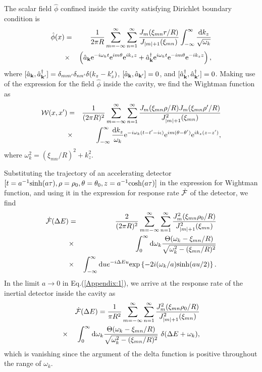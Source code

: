\documentclass[aps,prl,nofootinbib,preprintnumbers,floatfix,twocolumn,superscriptaddress]{revtex4}
\def\nn{\nonumber}
\def\nn{\nonumber}
\def\l{\left}
\def\r{\right}
\def\d{{\rm d}}
\def\f{\frac}
\def\e{{\rm e}}
\begin{document}
The scalar field ${\hat \phi}$ confined inside the cavity 
satisfying Dirichlet boundary condition is 
\begin{eqnarray}
 {\hat \phi}(x)&=&\f{1}{2\pi R}\sum_{m=-\infty}^{\infty}\sum_{n=1}^{\infty}
 \f{J_{m}(\xi_{mn} r/R)}{J_{|m|+1}(\xi_{mn})} 
 \int_{-\infty}^{\infty} \f{\d k_z}{\sqrt{\omega_k}} \\ 
 &\times& 
 \l({\hat a}_{\bf k} \e^{-i\omega_k t} \e^{im\theta} \e^{ik_z z}
 +{\hat a}^{\dagger}_{\bf k} \e^{i\omega_k t} \e^{-im\theta} \e^{-ik_z z}\r), \nn
\end{eqnarray}
where $[{\hat a}_{\bf k},{\hat a}^{\dagger}_{\bf k'}]
=\delta_{mm'} \delta_{nn'} \delta(k_{z}-k'_{z})$,
$[{\hat a}_{\bf k},{\hat a}_{\bf k'}]=0$, and $[{\hat a}^{\dagger}_{\bf k},
{\hat a}^{\dagger}_{\bf k'}]=0$.
Making use of the expression for the field ${\hat \phi}$ inside the cavity, we find the 
Wightman function as 
\begin{eqnarray}
 {\cal W}(x,x')&=&\f{1}{(2\pi R)^2}
 \sum_{m=-\infty}^{\infty} \sum_{n=1}^{\infty}
 \f{J_{m}(\xi_{mn} \rho/R)J_{m}(\xi_{mn} \rho'/R)}{J^2_{|m|+1}(\xi_{mn})} \nn \\
 &\times& \int_{-\infty}^{\infty} \f{\d k_z}{\omega_k}
 \e^{-i\omega_k (t-t'-i\epsilon)} \e^{im(\theta-\theta')} \e^{ik_z(z-z')}, 
\end{eqnarray}
where $\omega_k^2=(\xi_{mn}/R)^2+k_z^2$.

Substituting the trajectory of an accelerating detector
$[t=a^{-1} {\rm sinh}(a\tau),\rho=\rho_0,\theta=\theta_0,
z=a^{-1} {\rm cosh}(a\tau)]$ in the expression for 
Wightman function, and using it in the expression for response rate 
${\dot {\cal F}}$ of the detector, we find
\begin{eqnarray}
\label{Appendix:1}
 {\dot {\cal F}}(\Delta E)
 &=& \f{2}{(2\pi R)^2} \sum_{m=-\infty}^{\infty} \sum_{n=1}^{\infty}
 \f{J_{m}^2(\xi_{mn} \rho_0/R)}{J^2_{|m|+1}(\xi_{mn})} \\
 &\times& \int_{0}^{\infty} \d \omega_k 
 \f{\Theta(\omega_k-\xi_{mn}/R)}{\sqrt{\omega_{k}^2-(\xi_{mn}/R)^2}} \nn \\
 &\times& \int_{-\infty}^{\infty} \d u e^{-i\Delta Eu}
 {\rm exp}\l\{-2i(\omega_k/a) {\rm sinh}(au/2)\r\}. \nn
\end{eqnarray}
In the limit $a\to 0$ in Eq.(\ref{Appendix:1}), we arrive at the 
response rate of the inertial detector inside the cavity as
\begin{eqnarray}
 & & {\dot {\cal F}}(\Delta E)
 =\f{1}{\pi R^2} \sum_{m=-\infty}^{\infty} \sum_{n=1}^{\infty}
 \f{J_{m}^2(\xi_{mn} \rho_0/R)}{J^2_{|m|+1}(\xi_{mn})} \nn \\
 &\times& \int_{0}^{\infty} \d \omega_k 
 \f{\Theta(\omega_k-\xi_{mn}/R)}{\sqrt{\omega_{k}^2-(\xi_{mn}/R)^2}}~ 
 \delta(\Delta E+\omega_k),
\end{eqnarray}
which is vanishing since the argument of the delta function is positive 
throughout the range of $\omega_k$.
\end{document}
